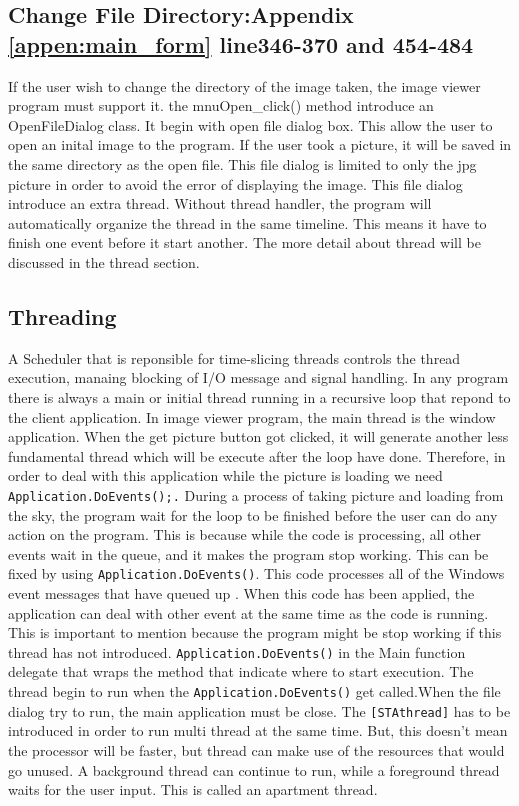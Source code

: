\subsection{Change File Directory:Appendix \ref{appen:main_form} line346-370 and 454-484 }%
If the user wish to change the directory of the image taken, the image viewer program must support it. the mnuOpen\_click() method introduce an OpenFileDialog class. It begin with open file dialog box. This allow the user to open an inital image to the program. If the user took a picture, it will be saved in the same directory as the open file. This file dialog is limited to only the jpg picture in order to avoid the error of displaying the image. 
This file dialog introduce an extra thread. Without thread handler, the program will automatically organize the thread in the same timeline. This means it have to finish one event before it start another. The more detail about thread will be discussed in the thread section. 

\subsection{Threading}

A Scheduler that is reponsible for time-slicing threads controls the thread execution, manaing blocking of I/O message and signal handling\cite{keithC}. In any program there is always a main or initial thread running in a recursive loop that repond to the client application. In image viewer program, the main thread is the window application. When the get picture button got clicked, it will generate another less fundamental thread which will be execute after the loop have done. Therefore, in order to deal with this application while the picture is loading we need \texttt{Application.DoEvents();.}
During a process of taking picture and loading from the sky, the program wait for the loop to be finished before the user can do any action on the program. This is because while the code is processing, all other events wait in the queue, and it makes the program stop working. This can be fixed by using \texttt{Application.DoEvents()}. This code processes all of the Windows event messages that have queued up \cite{davidW}. When this code has been applied, the application can deal with other event at the same time as the code is running. This is important to mention because the program might be stop working if this thread has not introduced.
        \texttt{Application.DoEvents()} in the Main function delegate that wraps the method that indicate where to start execution. The thread begin to run when the \texttt{Application.DoEvents()} get called\cite{xieX}.When the file dialog try to run, the main application must be close. The \texttt{[STAthread]} has to be introduced in order to run multi thread at the same time. But, this doesn't mean the processor will be faster, but thread can make use of the resources that would go unused. A background thread can continue to run, while a foreground thread waits for the user input. This is called an apartment thread. 
        
